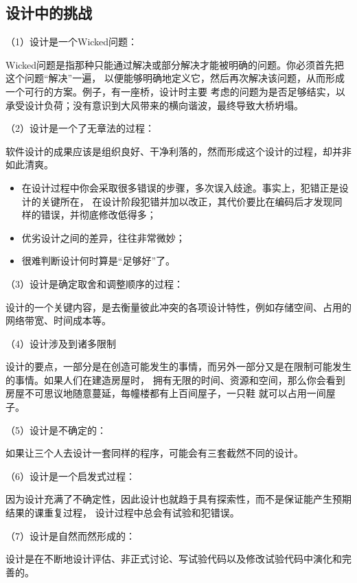 \documentclass{article}
\begin{document}
\subsection{设计中的挑战}
（1）设计是一个Wicked问题：
\par
Wicked问题是指那种只能通过解决或部分解决才能被明确的问题。你必须首先把这个问题“解决”一遍，
以便能够明确地定义它，然后再次解决该问题，从而形成一个可行的方案。例子，有一座桥，设计时主要
考虑的问题为是否足够结实，以承受设计负荷；没有意识到大风带来的横向谐波，最终导致大桥坍塌。

\par
（2）设计是一个了无章法的过程：
\par
软件设计的成果应该是组织良好、干净利落的，然而形成这个设计的过程，却并非如此清爽。
\begin{itemize}
    \item 在设计过程中你会采取很多错误的步骤，多次误入歧途。事实上，犯错正是设计的关键所在，
    在设计阶段犯错并加以改正，其代价要比在编码后才发现同样的错误，并彻底修改低得多；
    \item 优劣设计之间的差异，往往非常微妙；
    \item 很难判断设计何时算是“足够好”了。
\end{itemize}

\par
（3）设计是确定取舍和调整顺序的过程：
\par
设计的一个关键内容，是去衡量彼此冲突的各项设计特性，例如存储空间、占用的网络带宽、时间成本等。

\par
（4）设计涉及到诸多限制
\par
设计的要点，一部分是在创造可能发生的事情，而另外一部分又是在限制可能发生的事情。如果人们在建造房屋时，
拥有无限的时间、资源和空间，那么你会看到房屋不可思议地随意蔓延，每幢楼都有上百间屋子，一只鞋
就可以占用一间屋子。

\par
（5）设计是不确定的：
\par
如果让三个人去设计一套同样的程序，可能会有三套截然不同的设计。

\par
（6）设计是一个启发式过程：
\par
因为设计充满了不确定性，因此设计也就趋于具有探索性，而不是保证能产生预期结果的课重复过程，
设计过程中总会有试验和犯错误。

\par
（7）设计是自然而然形成的：
\par
设计是在不断地设计评估、非正式讨论、写试验代码以及修改试验代码中演化和完善的。
\end{document}
